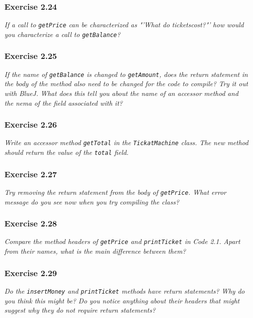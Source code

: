 \subsubsection*{Exercise 2.24}
\textit{If a call to \lstinline?getPrice? can be characterized as 
"'What do ticketscost?"' how would you characterize a call to 
\lstinline?getBalance?? }

\subsubsection*{Exercise 2.25}
\textit{If the name of \lstinline?getBalance? is changed to 
\lstinline?getAmount?, does the return statement in the body of the method 
also need to be changed for the code to compile? Try it out with BlueJ. What 
does this tell you about the name of an accessor method and the nema of the 
field associated with it? }

\subsubsection*{Exercise 2.26}
\textit{Write an accessor method \lstinline?getTotal? in the 
\lstinline?TickatMachine? class. The new method should return the value of the 
\lstinline?total? field. }

\subsubsection*{Exercise 2.27}
\textit{Try removing the return statement from the body of 
\lstinline?getPrice?. What error message do you see now when you try compiling 
the class? }

\subsubsection*{Exercise 2.28}
\textit{Compare the method headers of \lstinline?getPrice? and 
\lstinline?printTicket? in Code 2.1. Apart from their names, what is the main 
difference between them? }

\subsubsection*{Exercise 2.29}
\textit{Do the \lstinline?insertMoney? and \lstinline?printTicket? methods have 
return statements? Why do you think this might be? Do you notice anything about 
their headers that might suggest why they do not require return statements? }

